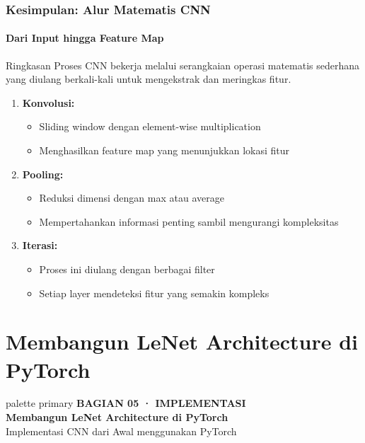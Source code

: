 \documentclass[t,aspectratio=169,xcolor=dvipsnames]{beamer}
\begin{document}
\begin{frame}
    \frametitle{Kesimpulan: Alur Matematis CNN}
    \framesubtitle{Dari Input hingga Feature Map}
    \small

    \begin{block}{Ringkasan Proses}
        CNN bekerja melalui serangkaian operasi matematis sederhana yang diulang berkali-kali untuk mengekstrak dan meringkas fitur.
    \end{block}

    \begin{enumerate}
        \item \textbf{Konvolusi:} 
        \begin{itemize}
            \item Sliding window dengan element-wise multiplication
            \item Menghasilkan feature map yang menunjukkan lokasi fitur
        \end{itemize}
        
        \item \textbf{Pooling:}
        \begin{itemize}
            \item Reduksi dimensi dengan max atau average
            \item Mempertahankan informasi penting sambil mengurangi kompleksitas
        \end{itemize}
        
        \item \textbf{Iterasi:}
        \begin{itemize}
            \item Proses ini diulang dengan berbagai filter
            \item Setiap layer mendeteksi fitur yang semakin kompleks
        \end{itemize}
    \end{enumerate}

\end{frame}




\section{Membangun LeNet Architecture di PyTorch}

\begin{frame}[plain]
  \begin{beamercolorbox}[wd=\paperwidth,ht=\paperheight,sep=1.5cm]{palette primary}
    \vspace{1.5cm}
    {\scriptsize\bfseries\color{dlMute}BAGIAN 05 · IMPLEMENTASI}\\[0.4cm]
    {\Huge\bfseries Membangun LeNet Architecture di PyTorch}\\[0.4cm]
    {\small\color{dlHairline}Implementasi CNN dari Awal menggunakan PyTorch}
    \vfill
  \end{beamercolorbox}
\end{frame}
\end{document}

